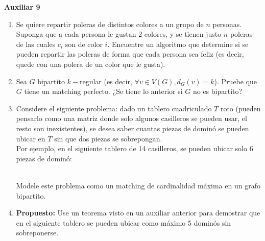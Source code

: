 

\header
\begin{center}
	\LARGE \bf{Auxiliar 9}
\end{center}

\begin{enumerate}[label ={\bf P\arabic*}]

    \item Se quiere repartir poleras de distintos colores a un grupo de $n$ personas. Suponga que a cada persona le gustan 2 colores, y se tienen justo $n$ poleras de las cuales $c_i$ son de color $i$. Encuentre un algoritmo que determine si se pueden repartir las poleras de forma que cada persona sea feliz (es decir, quede con una polera de un color que le gusta).
    
    \item Sea $G$ bipartito $k-$regular (es decir, $\forall v \in V(G), d_G(v)=k$). Pruebe que $G$ tiene un matching perfecto. ¿Se tiene lo anterior si $G$ no es bipartito?
    
    \item Considere el siguiente problema: dado un tablero cuadriculado $T$ roto (pueden pensarlo como una matriz donde solo algunos casilleros se pueden usar, el resto son inexistentes), se desea saber cuantas piezas de dominó se pueden ubicar en $T$ sin que dos piezas se sobrepongan. \\Por ejemplo, en el siguiente tablero de 14 casilleros, se pueden ubicar solo 6 piezas de dominó:\\ 
    \\
    Modele este problema como un matching de cardinalidad máxima en un grafo bipartito.

    \item \textbf{Propuesto:} Use un teorema visto en un auxiliar anterior para demostrar que en el siguiente tablero se pueden ubicar como máximo 5 dominós sin sobreponerse.\\


\end{enumerate}
